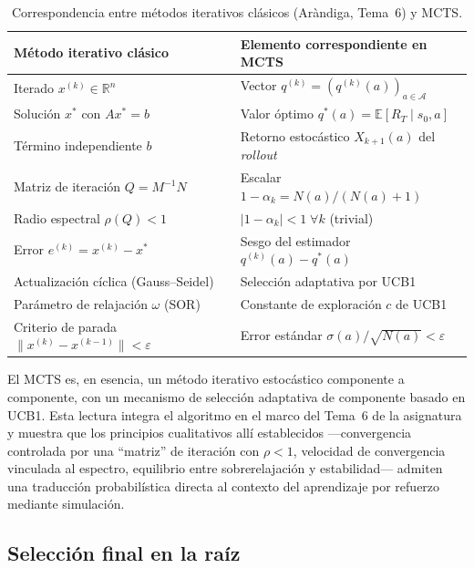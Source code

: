 \begin{table}[H]
    \centering
    \caption{Correspondencia entre métodos iterativos clásicos (Aràndiga, Tema~6) y MCTS.}
    \label{tab:analogia-iterativo}
    \begin{tabular}{@{}ll@{}}
        \toprule
        \textbf{Método iterativo clásico} & \textbf{Elemento correspondiente en MCTS} \\
        \midrule
        Iterado $x^{(k)} \in \mathbb{R}^n$ & Vector $q^{(k)} = (q^{(k)}(a))_{a\in\mathcal{A}}$ \\
        Solución $x^*$ con $Ax^* = b$ & Valor óptimo $q^*(a) = \mathbb{E}[R_T \mid s_0, a]$ \\
        Término independiente $b$ & Retorno estocástico $X_{k+1}(a)$ del \emph{rollout} \\
        Matriz de iteración $Q = M^{-1}N$ & Escalar $1 - \alpha_k = N(a)/(N(a)+1)$ \\
        Radio espectral $\rho(Q) < 1$ & $|1 - \alpha_k| < 1 \;\forall k$ (trivial) \\
        Error $e^{(k)} = x^{(k)} - x^*$ & Sesgo del estimador $q^{(k)}(a) - q^*(a)$ \\
        Actualización cíclica (Gauss--Seidel) & Selección adaptativa por UCB1 \\
        Parámetro de relajación $\omega$ (SOR) & Constante de exploración $c$ de UCB1 \\
        Criterio de parada $\|x^{(k)}-x^{(k-1)}\| < \varepsilon$ & Error estándar $\sigma(a)/\sqrt{N(a)} < \varepsilon$ \\
        \bottomrule
    \end{tabular}
\end{table}

\noindent El MCTS es, en esencia, un método iterativo estocástico componente a componente, con un mecanismo de selección adaptativa de componente basado en UCB1. Esta lectura integra el algoritmo en el marco del Tema~6 de la asignatura y muestra que los principios cualitativos allí establecidos ---convergencia controlada por una ``matriz'' de iteración con $\rho < 1$, velocidad de convergencia vinculada al espectro, equilibrio entre sobrerelajación y estabilidad--- admiten una traducción probabilística directa al contexto del aprendizaje por refuerzo mediante simulación.

\subsection{Selección final en la raíz}
\label{subsec:seleccion-final}

